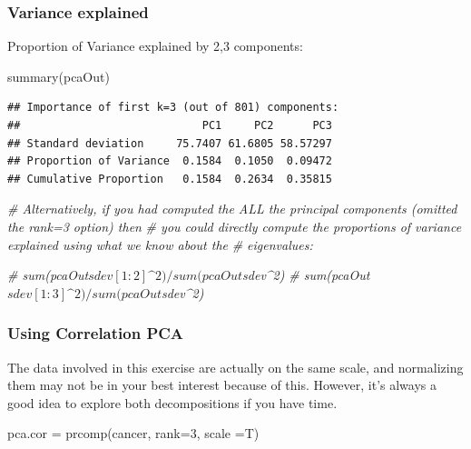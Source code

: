 \documentclass[
]{article}
\newenvironment{Shaded}{\begin{snugshade}}{\end{snugshade}}
\newcommand{\AttributeTok}[1]{\textcolor[rgb]{0.77,0.63,0.00}{#1}}
\newcommand{\CommentTok}[1]{\textcolor[rgb]{0.56,0.35,0.01}{\textit{#1}}}
\newcommand{\DecValTok}[1]{\textcolor[rgb]{0.00,0.00,0.81}{#1}}
\newcommand{\FunctionTok}[1]{\textcolor[rgb]{0.00,0.00,0.00}{#1}}
\newcommand{\NormalTok}[1]{#1}
\newcommand{\OtherTok}[1]{\textcolor[rgb]{0.56,0.35,0.01}{#1}}
\theoremstyle{definition}
\theoremstyle{definition}
\theoremstyle{definition}
\theoremstyle{definition}
\theoremstyle{remark}
\begin{document}
\hypertarget{variance-explained}{%
\subsubsection{Variance explained}\label{variance-explained}}

Proportion of Variance explained by 2,3 components:

\begin{Shaded}
\begin{Highlighting}[]
\FunctionTok{summary}\NormalTok{(pcaOut)}
\end{Highlighting}
\end{Shaded}

\begin{verbatim}
## Importance of first k=3 (out of 801) components:
##                            PC1     PC2      PC3
## Standard deviation     75.7407 61.6805 58.57297
## Proportion of Variance  0.1584  0.1050  0.09472
## Cumulative Proportion   0.1584  0.2634  0.35815
\end{verbatim}

\begin{Shaded}
\begin{Highlighting}[]
\CommentTok{\# Alternatively, if you had computed the ALL the principal components (omitted the rank=3 option) then }
\CommentTok{\# you could directly compute the proportions of variance explained using what we know about the }
\CommentTok{\# eigenvalues:}

\CommentTok{\# sum(pcaOut$sdev[1:2]\^{}2)/sum(pcaOut$sdev\^{}2)}
\CommentTok{\# sum(pcaOut$sdev[1:3]\^{}2)/sum(pcaOut$sdev\^{}2)}
\end{Highlighting}
\end{Shaded}

\hypertarget{using-correlation-pca}{%
\subsubsection{Using Correlation PCA}\label{using-correlation-pca}}

The data involved in this exercise are actually on the same scale, and normalizing them may not be in your best interest because of this. However, it's always a good idea to explore both decompositions if you have time.

\begin{Shaded}
\begin{Highlighting}[]
\NormalTok{pca.cor }\OtherTok{=} \FunctionTok{prcomp}\NormalTok{(cancer, }\AttributeTok{rank=}\DecValTok{3}\NormalTok{, }\AttributeTok{scale =}\NormalTok{T)}
\end{Highlighting}
\end{Shaded}
\end{document}
